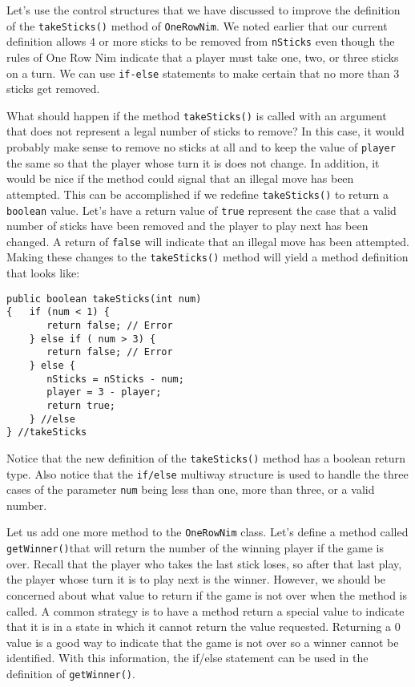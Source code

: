 \noindent Let's use the control structures that we have discussed
to improve the definition of the {\tt takeSticks()} method
of {\tt OneRowNim}.  We noted earlier that our current definition
allows $4$ or more sticks to be removed from {\tt nSticks} even though
the rules of One Row Nim indicate that a player must take one, two, or
three sticks on a turn.  We can use {\tt if-else} statements
to make certain that no more than $3$ sticks get removed.

What should happen if the method {\tt takeSticks()} is called with an
argument that does not represent a legal number of sticks to remove?
In this case, it would probably make sense to remove no sticks at all
and to keep the value of {\tt player} the same so that the player whose turn
it is does not change. In addition, it would be nice if the method could
signal that an illegal move has been attempted.  This can  be accomplished if
we redefine {\tt takeSticks()} to return a {\tt boolean} value. Let's have
a return value of {\tt true} represent the case that a valid number of sticks
have been removed and the player to play next has been changed. A return
of {\tt false} will indicate that an illegal move has been attempted.  Making
these changes to the {\tt takeSticks()} method will yield a method definition
that looks like:

\begin{jjjlisting}
\begin{lstlisting}
public boolean takeSticks(int num) 
{   if (num < 1) {
       return false; // Error
    } else if ( num > 3) {
       return false; // Error
    } else {
       nSticks = nSticks - num;
       player = 3 - player;
       return true;
    } //else
} //takeSticks
\end{lstlisting}
\end{jjjlisting}

\noindent Notice that the new definition of the {\tt takeSticks()} method
has a boolean return type.  Also notice that the {\tt if/else} multiway
structure is used to handle the three cases of the parameter {\tt num}
being less than one, more than three, or a valid number.

Let us add one more method to the {\tt OneRowNim} class.  Let's define
a method called {\tt getWinner()}that will return the number of the
winning player if the game is over. Recall that the player who takes
the last stick loses, so after that last play, the player whose turn
it is to play next is the winner. However, we should be concerned
about what value to return if the game is not over when the method is
called. A common strategy is to have a method return a special value
to indicate that it is in a state in which it cannot return the value
requested.  Returning a $0$ value is a good way to indicate that the
game is not over so a winner cannot be identified.  With this
information, the {if/else} statement can be used in the definition of
{\tt getWinner()}.

